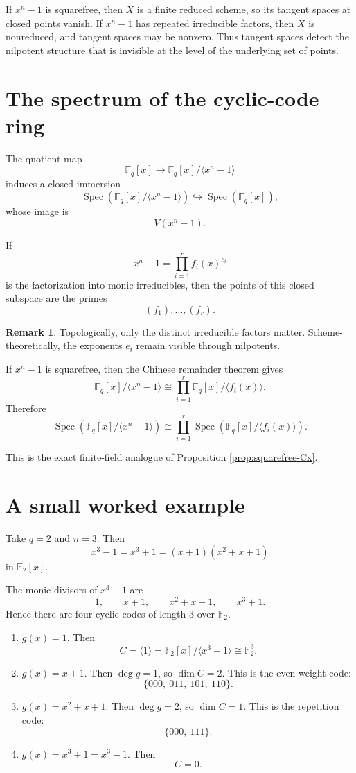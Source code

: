 \documentclass[11pt]{article}
\theoremstyle{definition}
\newtheorem{remark}[theorem]{Remark}
\newcommand{\F}{\mathbb{F}}
\newcommand{\Spec}{\operatorname{Spec}}
\newcommand{\ideal}[1]{\langle #1\rangle}
\newcommand{\ol}[1]{\overline{#1}}
\begin{document}
	If \(x^n-1\) is squarefree, then \(X\) is a finite reduced scheme, so its tangent spaces at closed points vanish. If \(x^n-1\) has repeated irreducible factors, then \(X\) is nonreduced, and tangent spaces may be nonzero. Thus tangent spaces detect the nilpotent structure that is invisible at the level of the underlying set of points.
	
	\section{The spectrum of the cyclic-code ring}
	
	The quotient map
	\[
	\F_q[x]\to \F_q[x]/\ideal{x^n-1}
	\]
	induces a closed immersion
	\[
	\Spec\!\left(\F_q[x]/\ideal{x^n-1}\right)\hookrightarrow \Spec(\F_q[x]),
	\]
	whose image is
	\[
	V(x^n-1).
	\]
	
	If
	\[
	x^n-1=\prod_{i=1}^r f_i(x)^{e_i}
	\]
	is the factorization into monic irreducibles, then the points of this closed subspace are the primes
	\[
	(f_1),\dots,(f_r).
	\]
	
	\begin{remark}
		Topologically, only the distinct irreducible factors matter. Scheme-theoretically, the exponents \(e_i\) remain visible through nilpotents.
	\end{remark}
	
	If \(x^n-1\) is squarefree, then the Chinese remainder theorem gives
	\[
	\F_q[x]/\ideal{x^n-1}
	\cong
	\prod_{i=1}^r \F_q[x]/\ideal{f_i(x)}.
	\]
	Therefore
	\[
	\Spec\!\left(\F_q[x]/\ideal{x^n-1}\right)
	\cong
	\coprod_{i=1}^r \Spec\!\left(\F_q[x]/\ideal{f_i(x)}\right).
	\]
	
	This is the exact finite-field analogue of Proposition \ref{prop:squarefree-Cx}.
	
	\section{A small worked example}
	
	Take \(q=2\) and \(n=3\). Then
	\[
	x^3-1=x^3+1=(x+1)(x^2+x+1)
	\]
	in \(\F_2[x]\).
	
	The monic divisors of \(x^3-1\) are
	\[
	1,\qquad x+1,\qquad x^2+x+1,\qquad x^3+1.
	\]
	Hence there are four cyclic codes of length \(3\) over \(\F_2\).
	
	\begin{enumerate}[label=\textbf{(\arabic*)}]
		\item \(g(x)=1\). Then
		\[
		C=\ideal{\ol{1}}=\F_2[x]/\ideal{x^3-1}\cong \F_2^3.
		\]
		
		\item \(g(x)=x+1\). Then \(\deg g=1\), so \(\dim C=2\). This is the even-weight code:
		\[
		\{000,\ 011,\ 101,\ 110\}.
		\]
		
		\item \(g(x)=x^2+x+1\). Then \(\deg g=2\), so \(\dim C=1\). This is the repetition code:
		\[
		\{000,\ 111\}.
		\]
		
		\item \(g(x)=x^3+1=x^3-1\). Then
		\[
		C=0.
		\]
	\end{enumerate}
	
\end{document}
